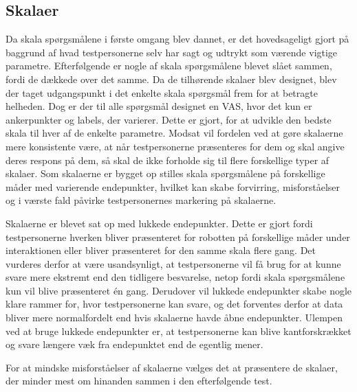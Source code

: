 \subsection{Skalaer}
\label{DiskussionSkalaer}
%
Da skala spørgsmålene i første omgang blev dannet, er det hovedsageligt gjort på baggrund af hvad testpersonerne selv har sagt og udtrykt som værende vigtige parametre. Efterfølgende er nogle af skala spørgsmålene blevet slået sammen, fordi de dækkede over det samme. Da de tilhørende skalaer blev designet, blev der taget udgangspunkt i det enkelte skala spørgsmål frem for at betragte helheden. Dog er der til alle spørgsmål designet en VAS, hvor det kun er ankerpunkter og labels, der varierer. Dette er gjort, for at udvikle den bedste skala til hver af de enkelte parametre. Modsat vil fordelen ved at gøre skalaerne mere konsistente være, at når testpersonerne præsenteres for dem og skal angive deres respons på dem, så skal de ikke forholde sig til flere forskellige typer af skalaer. Som skalaerne er bygget op stilles skala spørgsmålene på forskellige måder med varierende endepunkter, hvilket kan skabe forvirring, misforståelser og i værste fald påvirke testpersonernes markering på skalaerne. 

Skalaerne er blevet sat op med lukkede endepunkter. Dette er gjort fordi testpersonerne hverken bliver præsenteret for robotten på forskellige måder under interaktionen eller bliver præsenteret for den samme skala flere gang. Det vurderes derfor at være usandsynligt, at testpersonerne vil få brug for at kunne svare mere ekstremt end den tidligere besvarelse, netop fordi skala spørgsmålene kun vil blive præsenteret én gang. Derudover vil lukkede endepunkter skabe nogle klare rammer for, hvor testpersonerne kan svare, og det forventes derfor at data bliver mere normalfordelt end hvis skalaerne havde åbne endepunkter. Ulempen ved at bruge lukkede endepunkter er, at testpersonerne kan blive kantforskrækket og svare længere væk fra endepunktet end de egentlig mener. 

For at mindske misforståelser af skalaerne vælges det at præsentere de skalaer, der minder mest om hinanden sammen i den efterfølgende test.